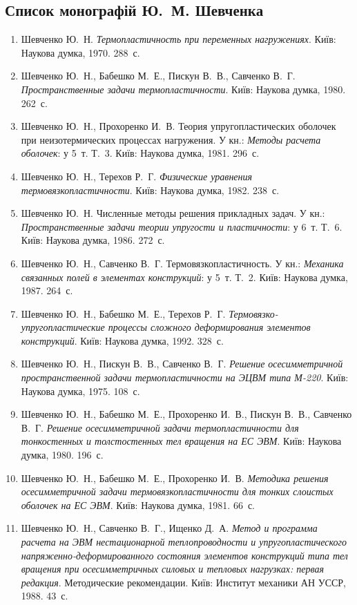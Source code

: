 \subsection*{Список монографій Ю.~М. Шевченка}
\begin{enumerate}[leftmargin=*,label=\arabic*.,itemsep=0.25em,topsep=0.4em]
\small
\item Шевченко Ю.~Н. \emph{Термопластичность при переменных нагружениях}. Київ: Наукова думка, 1970. 288~с.
\item Шевченко Ю.~Н., Бабешко М.~Е., Пискун В.~В., Савченко В.~Г. \emph{Пространственные задачи термопластичности}. Київ: Наукова думка, 1980. 262~с.
\item Шевченко Ю.~Н., Прохоренко И.~В. Теория упругопластических оболочек при неизотермических процессах нагружения. У кн.: \emph{Методы расчета оболочек}: у 5~т. Т.~3. Київ: Наукова думка, 1981. 296~с.
\item Шевченко Ю.~Н., Терехов Р.~Г. \emph{Физические уравнения термовязкопластичности}. Київ: Наукова думка, 1982. 238~с.
\item Шевченко Ю.~Н. Численные методы решения прикладных задач. У кн.: \emph{Пространственные задачи теории упругости и пластичности}: у 6~т. Т.~6. Київ: Наукова думка, 1986. 272~с.
\item Шевченко Ю.~Н., Савченко В.~Г. Термовязкопластичность. У кн.: \emph{Механика связанных полей в элементах конструкций}: у 5~т. Т.~2. Київ: Наукова думка, 1987. 264~с.
\item Шевченко Ю.~Н., Бабешко М.~Е., Терехов Р.~Г. \emph{Термовязко-упругопластические процессы сложного деформирования элементов конструкций}. Київ: Наукова думка, 1992. 328~с.
\item Шевченко Ю.~Н., Пискун В.~В., Савченко В.~Г. \emph{Решение осесимметричной пространственной задачи термопластичности на ЭЦВМ типа М-220}. Київ: Наукова думка, 1975. 108~с.
\item Шевченко Ю.~Н., Бабешко М.~Е., Прохоренко И.~В., Пискун В.~В., Савченко В.~Г. \emph{Решение осесимметричной задачи термопластичности для тонкостенных и толстостенных тел вращения на ЕС ЭВМ}. Київ: Наукова думка, 1980. 196~с.
\item Шевченко Ю.~Н., Бабешко М.~Е., Прохоренко И.~В. \emph{Методика решения осесимметричной задачи термовязкопластичности для тонких слоистых оболочек на ЕС ЭВМ}. Київ: Наукова думка, 1981. 66~с.
\item Шевченко Ю.~Н., Савченко В.~Г., Ищенко Д.~А. \emph{Метод и программа расчета на ЭВМ нестационарной теплопроводности и упругопластического напряженно-деформированного состояния элементов конструкций типа тел вращения при осесимметричных силовых и тепловых нагрузках: первая редакция}. Методические рекомендации. Київ: Институт механики АН УССР, 1988. 43~с.

\end{enumerate}
